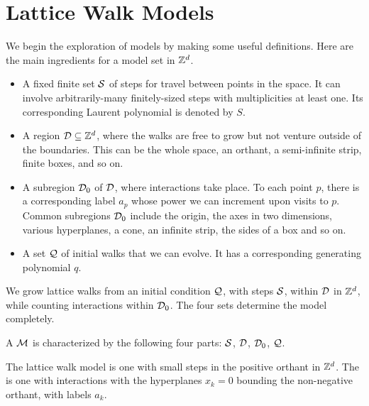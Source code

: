 
\chapter{\HighD Lattice Walk Models}
\label{ch:HigherD}

We begin the exploration of \highD models by making some useful definitions. Here are the main ingredients for a model set in $\mathbb{Z}^d$.

\begin{itemize}
	\item A fixed finite set $\mathcal{S}$ of steps for travel between points in the space. It can involve arbitrarily-many finitely-sized steps with multiplicities at least one. Its corresponding Laurent polynomial is denoted by $S$.
	\item A region $\mathcal{D} \subseteq \mathbb{Z}^d$, where the walks are free to grow but not venture outside of the boundaries. This can be the whole space, an orthant, a semi-infinite strip, finite boxes, and so on.
	\item A subregion $\mathcal{D}_0 $ of $\mathcal{D}$, where interactions take place. To each point $p$, there is a corresponding label $a_p$ whose power we can increment upon visits to $p$. Common subregions $\mathcal{D}_0$ include the origin, the axes in two dimensions, various \highD hyperplanes, a cone, an infinite strip, the sides of a box and so on.
	\item A set $\mathcal{Q}$ of initial walks that we can evolve. It has a corresponding generating polynomial $q$.
\end{itemize}

We grow lattice walks from an initial condition $\mathcal{Q}$, with steps $\mathcal{S}$, within $\mathcal{D}$ in $\mathbb{Z}^d$, while counting interactions within $\mathcal{D}_0$. The four sets determine the model completely.

\begin{defn} A  $\mathcal{M}$ is characterized by the following four parts: $\mathcal{S}$, $\mathcal{D}$, $\mathcal{D}_0$, $\mathcal{Q}$.
\end{defn}

\begin{defn} The \textitbf{\classic}\dD lattice walk model is one with small steps in the positive orthant in $\mathbb{Z}^d$. The  is one with interactions with the hyperplanes $x_k = 0$ bounding the non-negative orthant, with labels $a_k$.
\end{defn}

